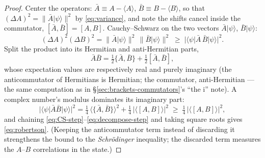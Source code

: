 \documentclass[11pt]{article}
\theoremstyle{plain}
\theoremstyle{definition}
\theoremstyle{remark}
\newcommand{\ii}{\mathrm{i}}
\newcommand{\ket}[1]{\lvert #1 \rangle}
\newcommand{\bra}[1]{\langle #1 \rvert}
\begin{document}
\begin{proof}
Center the operators: $\bar A \equiv A - \langle A\rangle$,
$\bar B \equiv B - \langle B\rangle$, so that
$(\Delta A)^2 = \|\bar A\ket\psi\|^2$ by \eqref{eq:variance}, and
note the shifts cancel inside the commutator,
$[\bar A, \bar B] = [A, B]$. Cauchy--Schwarz on the two vectors
$\bar A\ket\psi$, $\bar B\ket\psi$:
\begin{equation}
  (\Delta A)^2 (\Delta B)^2
  = \|\bar A\ket\psi\|^2\,\|\bar B\ket\psi\|^2
  \;\ge\;
  \bigl|\bra\psi \bar A\,\bar B\ket\psi\bigr|^2 .
  \label{eq:CS-step}
\end{equation}
Split the product into its Hermitian and anti-Hermitian parts,
\begin{equation}
  \bar A \bar B
  = \tfrac12\{\bar A, \bar B\}
  + \tfrac12[\bar A, \bar B],
\end{equation}
whose expectation values are respectively real and purely imaginary
(the anticommutator of Hermitians is Hermitian; the commutator,
anti-Hermitian --- the same computation as in
\S\ref{sec:brackets-commutators}'s ``the $\ii$'' note). A complex
number's modulus dominates its imaginary part:
\begin{equation}
  \bigl|\bra\psi\bar A\bar B\ket\psi\bigr|^2
  = \tfrac14\,\bigl\langle\{\bar A, \bar B\}\bigr\rangle^2
  + \tfrac14\,\bigl|\bigl\langle[A, B]\bigr\rangle\bigr|^2
  \;\ge\;
  \tfrac14\,\bigl|\bigl\langle[A, B]\bigr\rangle\bigr|^2 ,
  \label{eq:decompose-step}
\end{equation}
and chaining \eqref{eq:CS-step}--\eqref{eq:decompose-step} and
taking square roots gives \eqref{eq:robertson}. (Keeping the
anticommutator term instead of discarding it strengthens the bound
to the \emph{Schr\"odinger} inequality; the discarded term measures
the $A$--$B$ correlations in the state.)
\end{proof}
\end{document}
